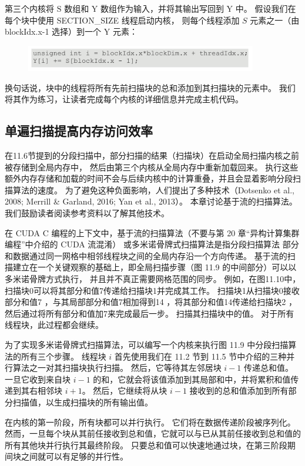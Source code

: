 第三个内核将 $\mathrm{S}$ 数组和 $\mathrm{Y}$ 数组作为输入，并将其输出写回到 Y 中。
假设我们在每个块中使用 SECTION\_SIZE 线程启动内核，
则每个线程添加 $S$ 元素之一（由 blockIdx.x-1 选择）到一个 $\mathrm{Y}$ 元素：

\begin{figure}[H]
	\centering
	\includegraphics[width=0.9\textwidth]{figs/F11-a6.png}
\end{figure}

换句话说，块中的线程将所有先前扫描块的总和添加到其扫描块的元素中。 
我们将其作为练习，让读者完成每个内核的详细信息并完成主机代码。

\subsection{单遍扫描提高内存访问效率}
在11.6节提到的分段扫描中，部分扫描的结果（扫描块）在启动全局扫描内核之前被存储到全局内存中，
然后由第三个内核从全局内存中重新加载回来。 
执行这些额外内存存储和加载的时间不会与后续内核中的计算重叠，并且会显着影响分段扫描算法的速度。 
为了避免这种负面影响，人们提出了多种技术（Dotsenko et al., 2008; Merrill \& Garland, 2016; Yan et al., 2013）。 
本章讨论基于流的扫描算法。 我们鼓励读者阅读参考资料以了解其他技术。

在 CUDA C 编程的上下文中，基于流的扫描算法（不要与第 20 章“异构计算集群编程”中介绍的 CUDA 流混淆）
或多米诺骨牌式扫描算法是指分段扫描算法 部分和数据通过同一网格中相邻线程块之间的全局内存沿一个方向传递。 
基于流的扫描建立在一个关键观察的基础上，即全局扫描步骤（图 11.9 的中间部分）可以以多米诺骨牌方式执行，
并且并不真正需要网格范围的同步。 例如，在图11.10中，扫描块0可以将其部分和值7传递给扫描块1并完成其工作。 
扫描块1从扫描块0接收部分和值7 ，与其局部部分和值7相加得到14 ，将其部分和值14传递给扫描块2 ，
然后通过将所有部分和值加7来完成最后一步。 扫描其扫描块中的值。 对于所有线程块，此过程都会继续。

为了实现多米诺骨牌式扫描算法，可以编写一个内核来执行图 11.9 中分段扫描算法的所有三个步骤。 
线程块 $i$ 首先使用我们在 11.2 节到 11.5 节中介绍的三种并行算法之一对其扫描块执行扫描。 
然后，它等待其左邻居块 $i-1$ 传递总和值。 
一旦它收到来自块 $i-1$ 的和，它就会将该值添加到其局部和中，并将累积和值传递到其右相邻块 $i+1$。 
然后，它继续将从块 $i-1$ 接收到的总和值添加到所有部分扫描值，以生成扫描块的所有输出值。

在内核的第一阶段，所有块都可以并行执行。 它们将在数据传递阶段被序列化。 
然而，一旦每个块从其前任接收到总和值，它就可以与已从其前任接收到总和值的所有其他块并行执行其最终阶段。 
只要总和值可以快速地通过块，在第三阶段期间块之间就可以有足够的并行性。

